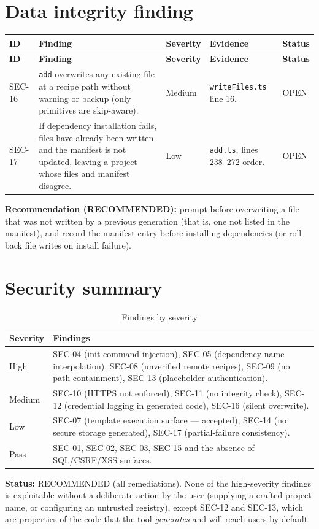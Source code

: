 \section{Data integrity finding}

\begin{longtable}{@{}L{1.3cm}L{3.6cm}L{1.9cm}L{5.8cm}L{1.6cm}@{}}
\toprule
\textbf{ID} & \textbf{Finding} & \textbf{Severity} & \textbf{Evidence} & \textbf{Status} \\
\midrule
\endfirsthead
\toprule
\textbf{ID} & \textbf{Finding} & \textbf{Severity} & \textbf{Evidence} & \textbf{Status} \\
\midrule
\endhead
SEC-16 & \texttt{add} overwrites any existing file at a recipe path without warning
or backup (only primitives are skip-aware). & Medium &
\texttt{writeFiles.ts} line 16. & OPEN \\
SEC-17 & If dependency installation fails, files have already been written and the
manifest is not updated, leaving a project whose files and manifest disagree. &
Low & \texttt{add.ts}, lines 238--272 order. & OPEN \\
\bottomrule
\end{longtable}

\textbf{Recommendation (RECOMMENDED):} prompt before overwriting a file that was
not written by a previous generation (that is, one not listed in the manifest), and
record the manifest entry before installing dependencies (or roll back file writes
on install failure).

\section{Security summary}

\begin{table}[H]
\centering
\caption{Findings by severity}
\begin{tabular}{@{}L{2.6cm}L{11.6cm}@{}}
\toprule
\textbf{Severity} & \textbf{Findings} \\
\midrule
High & SEC-04 (init command injection), SEC-05 (dependency-name interpolation),
SEC-08 (unverified remote recipes), SEC-09 (no path containment), SEC-13 (placeholder
authentication). \\
Medium & SEC-10 (HTTPS not enforced), SEC-11 (no integrity check), SEC-12
(credential logging in generated code), SEC-16 (silent overwrite). \\
Low & SEC-07 (template execution surface --- accepted), SEC-14 (no secure storage
generated), SEC-17 (partial-failure consistency). \\
Pass & SEC-01, SEC-02, SEC-03, SEC-15 and the absence of SQL/CSRF/XSS surfaces. \\
\bottomrule
\end{tabular}
\end{table}

\textbf{Status:} RECOMMENDED (all remediations). None of the high-severity findings
is exploitable without a deliberate action by the user (supplying a crafted project
name, or configuring an untrusted registry), except SEC-12 and SEC-13, which are
properties of the code that the tool \emph{generates} and will reach users by
default.
